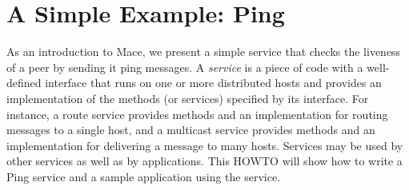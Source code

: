 % 
% 
% 
% 
% 
% 
\section{A Simple Example: Ping}
\label{sec:firstping}

As an introduction to Mace, we present a simple service that checks
the liveness of a peer by sending it ping messages.  A \emph{service}
is a piece of code with a well-defined interface that runs on one or
more distributed hosts and provides an implementation of the methods
(or services) specified by its interface.  For instance, a route
service provides methods and an implementation for routing messages to
a single host, and a multicast service provides methods and an
implementation for delivering a message to many hosts.  Services may
be used by other services as well as by applications.  This HOWTO will
show how to write a Ping service and a sample application using the
service.

